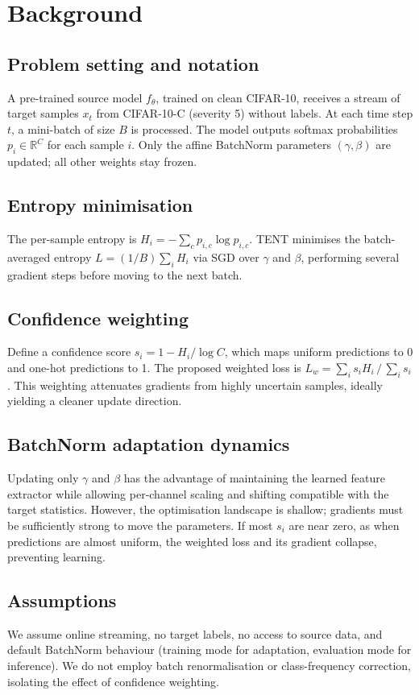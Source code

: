 \documentclass{article} %
\begin{document}
\section{Background}%
\label{sec:background}%
\subsection{Problem setting and notation}
A pre-trained source model \(f_{\theta}\), trained on clean CIFAR-10, receives a stream of target samples \(x_{t}\) from CIFAR-10-C (severity 5) without labels. At each time step \(t\), a mini-batch of size \(B\) is processed. The model outputs softmax probabilities \(p_{i} \in \mathbb{R}^{C}\) for each sample \(i\). Only the affine BatchNorm parameters \((\gamma, \beta)\) are updated; all other weights stay frozen.

\subsection{Entropy minimisation}
The per-sample entropy is \(H_{i} = -\sum_{c} p_{i,c} \log p_{i,c}\). TENT minimises the batch-averaged entropy \(L = (1/B) \sum_{i} H_{i}\) via SGD over \(\gamma\) and \(\beta\), performing several gradient steps before moving to the next batch.

\subsection{Confidence weighting}
Define a confidence score \(s_{i} = 1 - H_{i}/\log C\), which maps uniform predictions to 0 and one-hot predictions to 1. The proposed weighted loss is \(L_{w} = \sum_{i} s_{i} H_{i}\,/\, \sum_{i} s_{i}\). This weighting attenuates gradients from highly uncertain samples, ideally yielding a cleaner update direction.

\subsection{BatchNorm adaptation dynamics}
Updating only \(\gamma\) and \(\beta\) has the advantage of maintaining the learned feature extractor while allowing per-channel scaling and shifting compatible with the target statistics. However, the optimisation landscape is shallow; gradients must be sufficiently strong to move the parameters. If most \(s_{i}\) are near zero, as when predictions are almost uniform, the weighted loss and its gradient collapse, preventing learning.

\subsection{Assumptions}
We assume online streaming, no target labels, no access to source data, and default BatchNorm behaviour (training mode for adaptation, evaluation mode for inference). We do not employ batch renormalisation or class-frequency correction, isolating the effect of confidence weighting.
\end{document}
